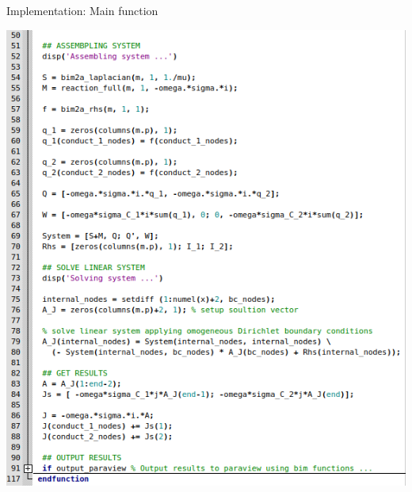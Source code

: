 \documentclass[aspectratio=54,xcolor=dvipsnames]{beamer}
\begin{document}
\begin{frame}{Implementation: Main function}
\begin{center}
\begin{minipage}{0.49\textwidth}
            \includegraphics[width=\textwidth]{Images/Main_code2.png}
        \end{minipage}
    \end{center}
\end{frame}
\end{document}
